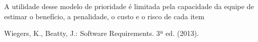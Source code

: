 \documentclass[runningheads]{llncs}
\begin{document}
A utilidade desse modelo de prioridade é limitada pela capacidade da equipe de estimar o benefício, a penalidade, o custo e o risco de cada item




%
%
%
% 
% 
%
\begin{thebibliography}{}
Wiegers, K., Beatty, J.: Software Requirements. 3ª ed. (2013).
\end{thebibliography}
\end{document}
